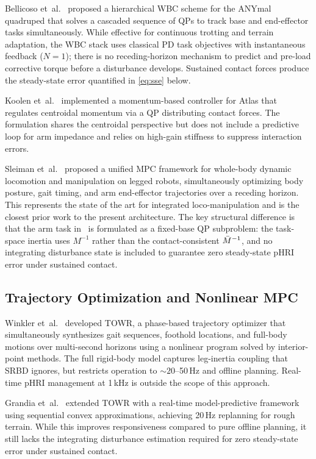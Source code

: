 Bellicoso et~al.~\cite{bellicoso2016perception} proposed a hierarchical WBC
scheme for the ANYmal quadruped that solves a cascaded sequence of QPs to
track base and end-effector tasks simultaneously.
While effective for continuous trotting and terrain adaptation, the WBC
stack uses classical PD task objectives with instantaneous feedback
($N{=}1$); there is no receding-horizon mechanism to predict and pre-load
corrective torque before a disturbance develops.
Sustained contact forces produce the steady-state error quantified in
\eqref{eq:sse} below.

Koolen et~al.~\cite{koolen2016design} implemented a momentum-based
controller for Atlas that regulates centroidal momentum via a QP
distributing contact forces.
The formulation shares the centroidal perspective but does not include a
predictive loop for arm impedance and relies on high-gain stiffness to
suppress interaction errors.

Sleiman et~al.~\cite{sleiman2021unified} proposed a unified MPC framework
for whole-body dynamic locomotion and manipulation on legged robots,
simultaneously optimizing body posture, gait timing, and arm end-effector
trajectories over a receding horizon.
This represents the state of the art for integrated loco-manipulation and
is the closest prior work to the present architecture.
The key structural difference is that the arm task in~\cite{sleiman2021unified}
is formulated as a fixed-base QP subproblem: the task-space inertia uses
$M^{-1}$ rather than the contact-consistent $\bar{M}^{-1}$, and no integrating
disturbance state is included to guarantee zero steady-state pHRI error
under sustained contact.

\subsection{Trajectory Optimization and Nonlinear MPC}

Winkler et~al.~\cite{winkler2018gait} developed TOWR, a phase-based
trajectory optimizer that simultaneously synthesizes gait sequences,
foothold locations, and full-body motions over multi-second horizons using a
nonlinear program solved by interior-point methods.
The full rigid-body model captures leg-inertia coupling that SRBD ignores,
but restricts operation to ${\sim}20$--50\,Hz and offline planning.
Real-time pHRI management at 1\,kHz is outside the scope of this approach.

Grandia et~al.~\cite{grandia2023perceptive} extended TOWR with a real-time
model-predictive framework using sequential convex approximations, achieving
20\,Hz replanning for rough terrain.
While this improves responsiveness compared to pure offline planning, it
still lacks the integrating disturbance estimation required for zero
steady-state error under sustained contact.


